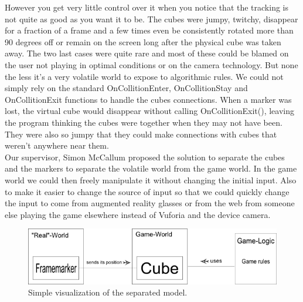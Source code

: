 However you get very little control over it when you notice that the tracking is not quite as good as you want it to be. The cubes were jumpy, twitchy, disappear for a fraction of a frame and a few times even be consistently rotated more than 90 degrees off or remain on the screen long after the physical cube was taken away. The two last cases were quite rare and most of these could be blamed on the user not playing in optimal conditions or on the camera technology. But none the less it's a very volatile world to expose to algorithmic rules. We could not simply rely on the standard OnCollitionEnter, OnCollitionStay and  OnCollitionExit functions to handle the cubes connections. When a marker was lost, the virtual cube would disappear without calling OnCollitionExit(), leaving the program thinking the cubes were together when they may not have been. They were also so jumpy that they could make connections with cubes that weren't anywhere near them.\\
Our supervisor, Simon McCallum proposed the solution to separate the cubes and the markers to separate the volatile world from the game world. In the game world we could then freely manipulate it without changing the initial input. Also to make it easier to change the source of input so that we could quickly change the input to come from augmented reality glasses or from the web from someone else playing the game elsewhere instead of Vuforia and the device camera.

\begin{figure}[ht] 
        \capstart
        \centering  
        \includegraphics[width=\textwidth]{includes/complexCubeMarkerModel.png}    
        \caption[Separated Cube-Marker model]{Simple visualization of the separated model.} 
        \label{fig:complex_cube_marker_model} 
\end{figure}

